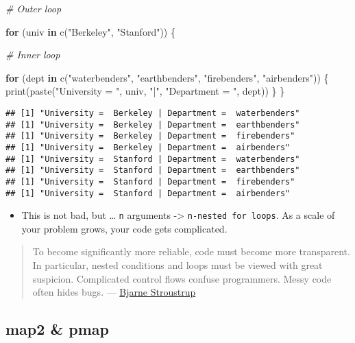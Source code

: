 \documentclass[
]{book}
\newenvironment{Shaded}{\begin{snugshade}}{\end{snugshade}}
\newcommand{\CommentTok}[1]{\textcolor[rgb]{0.56,0.35,0.01}{\textit{#1}}}
\newcommand{\ControlFlowTok}[1]{\textcolor[rgb]{0.13,0.29,0.53}{\textbf{#1}}}
\newcommand{\FunctionTok}[1]{\textcolor[rgb]{0.00,0.00,0.00}{#1}}
\newcommand{\NormalTok}[1]{#1}
\newcommand{\StringTok}[1]{\textcolor[rgb]{0.31,0.60,0.02}{#1}}
\providecommand{\tightlist}{%
  \setlength{\itemsep}{0pt}\setlength{\parskip}{0pt}}
\begin{document}
\begin{Shaded}
\begin{Highlighting}[]
\CommentTok{\# Outer loop}

\ControlFlowTok{for}\NormalTok{ (univ }\ControlFlowTok{in} \FunctionTok{c}\NormalTok{(}\StringTok{"Berkeley"}\NormalTok{, }\StringTok{"Stanford"}\NormalTok{)) \{}

  \CommentTok{\# Inner loop}

  \ControlFlowTok{for}\NormalTok{ (dept }\ControlFlowTok{in} \FunctionTok{c}\NormalTok{(}\StringTok{"waterbenders"}\NormalTok{, }\StringTok{"earthbenders"}\NormalTok{, }\StringTok{"firebenders"}\NormalTok{, }\StringTok{"airbenders"}\NormalTok{)) \{}
    \FunctionTok{print}\NormalTok{(}\FunctionTok{paste}\NormalTok{(}\StringTok{"University = "}\NormalTok{, univ, }\StringTok{"|"}\NormalTok{, }\StringTok{"Department = "}\NormalTok{, dept))}
\NormalTok{  \}}
\NormalTok{\}}
\end{Highlighting}
\end{Shaded}

\begin{verbatim}
## [1] "University =  Berkeley | Department =  waterbenders"
## [1] "University =  Berkeley | Department =  earthbenders"
## [1] "University =  Berkeley | Department =  firebenders"
## [1] "University =  Berkeley | Department =  airbenders"
## [1] "University =  Stanford | Department =  waterbenders"
## [1] "University =  Stanford | Department =  earthbenders"
## [1] "University =  Stanford | Department =  firebenders"
## [1] "University =  Stanford | Department =  airbenders"
\end{verbatim}

\begin{itemize}
\tightlist
\item
  This is not bad, but \ldots{} \texttt{n} arguments -\textgreater{} \texttt{n-nested\ for\ loops}. As a scale of your problem grows, your code gets complicated.
\end{itemize}

\begin{quote}
To become significantly more reliable, code must become more transparent. In particular, nested conditions and loops must be viewed with great suspicion. Complicated control flows confuse programmers. Messy code often hides bugs. --- \href{https://en.wikipedia.org/wiki/Bjarne_Stroustrup}{Bjarne Stroustrup}
\end{quote}

\hypertarget{map2-pmap}{%
\subsection{map2 \& pmap}\label{map2-pmap}}
\end{document}
